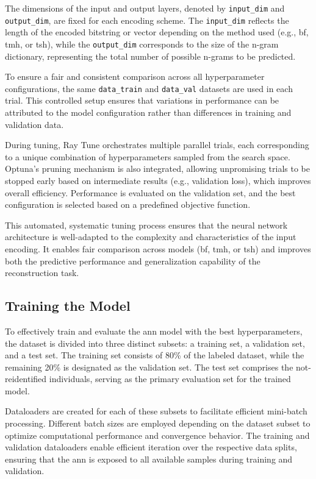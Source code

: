 The dimensions of the input and output layers, denoted by \texttt{input\_dim} and \texttt{output\_dim}, are fixed for each encoding scheme.
The \texttt{input\_dim} reflects the length of the encoded bitstring or vector depending on the method used (e.g., \ac{bf}, \ac{tmh}, or \ac{tsh}), while the \texttt{output\_dim} corresponds to the size of the n-gram dictionary, representing the total number of possible n-grams to be predicted.

To ensure a fair and consistent comparison across all hyperparameter configurations, the same \texttt{data\_train} and \texttt{data\_val} datasets are used in each trial.
This controlled setup ensures that variations in performance can be attributed to the model configuration rather than differences in training and validation data.

During tuning, Ray Tune orchestrates multiple parallel trials, each corresponding to a unique combination of hyperparameters sampled from the search space.
Optuna's pruning mechanism is also integrated, allowing unpromising trials to be stopped early based on intermediate results (e.g., validation loss), which improves overall efficiency.
Performance is evaluated on the validation set, and the best configuration is selected based on a predefined objective function.

This automated, systematic tuning process ensures that the neural network architecture is well-adapted to the complexity and characteristics of the input encoding.
It enables fair comparison across models (\ac{bf}, \ac{tmh}, or \ac{tsh}) and improves both the predictive performance and generalization capability of the reconstruction task.

\subsection{Training the Model} \label{sec:training}

To effectively train and evaluate the \ac{ann} model with the best hyperparameters, the dataset is divided into three distinct subsets: a training set, a validation set, and a test set.
The training set consists of 80\% of the labeled dataset, while the remaining 20\% is designated as the validation set.
The test set comprises the not-reidentified individuals, serving as the primary evaluation set for the trained model.

Dataloaders are created for each of these subsets to facilitate efficient mini-batch processing.
Different batch sizes are employed depending on the dataset subset to optimize computational performance and convergence behavior.
The training and validation dataloaders enable efficient iteration over the respective data splits, ensuring that the \ac{ann} is exposed to all available samples during training and validation.


